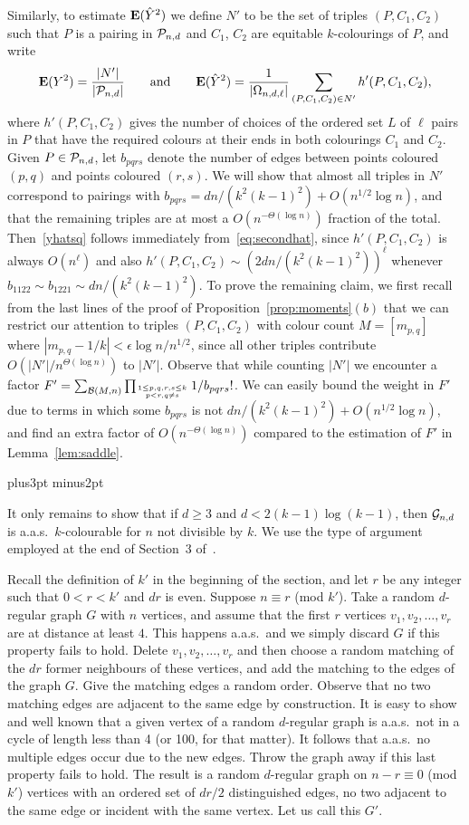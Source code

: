 \documentclass[12pt]{article}
\newcommand{\lab}[1]{\label{#1}}
\def\blackslug{\hbox{\kern1pt\vrule height6pt width4pt  depth1pt\kern1pt}}
\def\qed{\penalty 500\hbox{\quad\blackslug}\ifmmode\else\par
                                             \vskip4.5pt plus3pt minus2pt\fi}
\newcommand{\proofof}[1]{\par\noindent{\bf Proof of #1.\enspace}\rm}
\def\G{{\cal G}}
\def\P{{\cal P}}
\def\ex{{\bf E}}
\def\Gnd{\G_{n,d}}
\def\Pnd{\P_{n,d}}
\def\be{\begin{equation}}
\def\ee{\end{equation}}
\newcommand{\bel}[1]{\be\lab{#1}}
\newcommand{\mbf}[1] {\text{\boldmath$#1$}}
\newcommand{\cB} {\ensuremath{\mathcal B}}
\begin{document}
Similarly, to estimate $\ex (\hat Y^2)$ we define $N'$ to be the set of triples $(P,C_1,C_2)$ such that $P$ is a pairing in $\Pnd$ and $C_1$, $C_2$ are equitable $k$-colourings of $P$, and write
%
\bel{eq:secondhat}
\ex(Y^2) = \frac{|N'|}{|\Pnd|}
\qquad\text{and}\qquad
\ex(\hat Y^2) = \frac{1}{|\Omega_{n,d,\ell}|}
\sum_{(P,C_1,C_2)\in N'} h'(P,C_1,C_2),
\ee
where $h'(P,C_1,C_2)$ gives the number of choices of the ordered set $L$ of $\ell$ pairs in $P$ that have the required colours at their ends in both colourings $C_1$ and $C_2$. Given $P\in\Pnd$, let $b_{pqrs}$ denote the number of edges between points coloured $(p,q)$ and points coloured $(r,s)$. We will show that almost all triples in $N'$ correspond to pairings with $b_{pqrs}=dn/(k^2(k-1)^2)+ O(n^{1/2}\log n)$, and that the remaining triples are at most a $O(n^{-\Theta(\log n)})$ fraction of the total. Then~\eqref{yhatsq} follows immediately from~\eqref{eq:secondhat}, since $h'(P,C_1,C_2)$ is always $O(n^\ell)$ and also $h'(P,C_1,C_2) \sim (2dn/(k^2(k-1)^2))^\ell$ whenever $b_{1122}\sim b_{1221}\sim dn/(k^2(k-1)^2)$.
%
To prove the remaining claim, we first recall from the last lines of the proof of Proposition~\ref{prop:moments}$(b)$ that we can restrict our attention to triples $(P,C_1,C_2)$ with colour count $M=[m_{p,q}]$ where $|m_{p,q}-1/k|<\epsilon \log n/n^{1/2}$, since all other triples contribute $O(|N'|/n^{\Theta(\log n)})$ to $|N'|$.
%
Observe that while counting $|N'|$ we encounter a factor $F'=\sum_{\cB(M,n)} \prod_{1\le p,q,r,s\le k\atop p<r,q\ne s} 1/b_{pqrs}!$. We can easily bound the weight in $F'$ due to terms in which some $b_{pqrs}$ is not $dn/(k^2(k-1)^2)+ O(n^{1/2}\log n)$, and find an extra factor of $O(n^{-\Theta(\log n)})$ compared to the estimation of $F'$ in Lemma~\ref{lem:saddle}.
\qed


\proofof{Theorem~\ref{thm:main} (for $\mbf n$ not divisible by $\mbf k$)}
It only remains to show that if $d\ge3$ and $d<2(k-1)\log(k-1)$, then $\Gnd$ is a.a.s.\ $k$-colourable for $n$ not divisible by $k$. We use the type of argument employed at the end of Section~3 of~\cite{RW94}.

Recall the definition of $k'$ in the beginning of the section, and let $r$ be any integer such that $0<r<k'$ and $dr$ is even. Suppose $n\equiv r$ (mod $k'$). Take a random $d$-regular graph $G$ with $n$ vertices,  and assume that the first $r$ vertices $v_1,v_2,\ldots,v_r$ are at distance at least $4$. This happens a.a.s.\ and we simply discard $G$ if this property fails to hold. Delete $v_1,v_2,\ldots,v_r$ and then choose a random matching of the $dr$ former neighbours
of these vertices, and add the matching to the edges of the graph $G$.
Give the matching edges a random order.
Observe that no two matching edges are adjacent to the same edge by
construction. It is easy to show and well known that a given vertex of a random $d$-regular graph is a.a.s.\ not in a cycle of length less than 4 (or 100, for that matter). It follows that a.a.s.\ no multiple edges occur due to the new edges.  Throw the graph away if this last property fails to hold. The result is a random $d$-regular graph  on $n-r\equiv 0$ (mod $k'$) vertices with an ordered set of $dr/2$ distinguished edges, no two adjacent to the same edge or incident with the same vertex. Let us call this $G'$.
\end{document}
